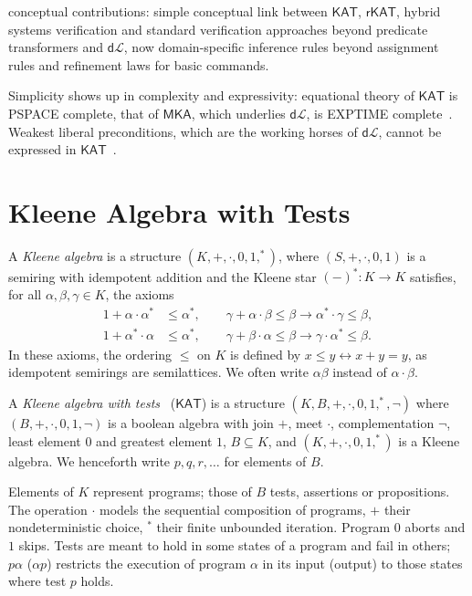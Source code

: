 \documentclass[envcountsame]{llncs}
\newcommand{\MKA}{\mathsf{MKA}}
\newcommand{\KAT}{\mathsf{KAT}}
\newcommand{\rKAT}{\mathsf{rKAT}}
\newcommand{\dL}{\mathsf{d}\mathcal{L}}
\begin{document}
conceptual contributions: simple conceptual link between $\KAT$,
$\rKAT$, hybrid systems verification and standard verification
approaches beyond predicate transformers and $\dL$, now
domain-specific inference rules beyond assignment rules and refinement
laws for basic commands. 

Simplicity shows up in complexity and expressivity: equational theory
of $\KAT$ is PSPACE complete, that of $\MKA$, which underlies $\dL$, is
EXPTIME complete~\cite{MollerS06}. Weakest liberal preconditions,
which are the working horses of $\dL$, cannot be expressed in $\KAT$~\cite{Struth16}.


\section{Kleene Algebra with Tests}\label{sec:kat} 

A \emph{Kleene algebra} is a structure $(K,+,\cdot,0,1,^\ast)$, where
$(S,+,\cdot,0,1)$ is a semiring with idempotent addition and the
Kleene star $(-)^\ast:K\to K$ satisfies, for all
$\alpha,\beta,\gamma\in K$, the axioms
\begin{align*} 
1+\alpha\cdot\alpha^\ast &\le \alpha^\ast, \qquad
  \gamma+\alpha\cdot
                                          \beta\le \beta\rightarrow \alpha^\ast \cdot \gamma\le \beta,\\
  1+\alpha^\ast\cdot\alpha &\le \alpha^\ast, \qquad \gamma+\beta\cdot
                             \alpha\le \beta\rightarrow \gamma\cdot
                             \alpha^\ast \le \beta.
\end{align*}
In these axioms, the ordering $\le$ on $K$ is defined by
$x\le y\leftrightarrow x+y=y$, as idempotent semirings are 
semilattices. We often write $\alpha\beta$ instead of
$\alpha\cdot\beta$.

A \emph{Kleene algebra with tests}~\cite{Kozen97} ($\KAT$) is a structure
$(K,B,+,\cdot,0,1,^\ast,\neg)$ where $(B,+,\cdot,0,1,\neg)$ is a
boolean algebra with join $+$, meet $\cdot$, complementation $\neg$,
least element $0$ and greatest element $1$, $B\subseteq K$, and
$(K,+,\cdot,0,1,^\ast)$ is a Kleene algebra. We henceforth write
$p,q,r,\dots$ for elements of $B$. 

Elements of $K$ represent programs; those of $B$ tests, assertions or
propositions.  The operation $\cdot$ models the sequential composition
of programs, $+$ their nondeterministic choice, $^\ast$ their finite
unbounded iteration. Program $0$ aborts and $1$ skips.  Tests are
meant to hold in some states of a program and fail in others;
$p\alpha$ ($\alpha p$) restricts the execution of program $\alpha$ in
its input (output) to those states where test $p$ holds.
\end{document}
